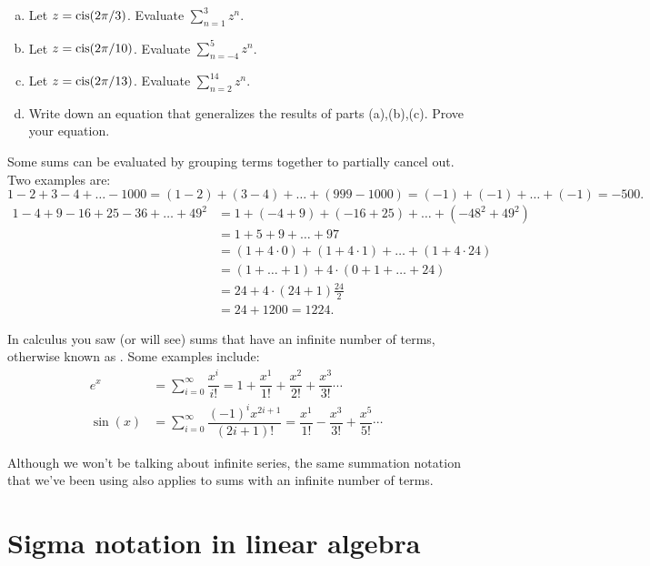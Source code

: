 \begin{exercise}{}
\begin{enumerate}[(a)]
\item
Let $z = \operatorname{cis} (2\pi/3)$.  Evaluate $\sum_{n=1}^3 z^n$.
\item
Let $z = \operatorname{cis} (2\pi/10)$.  Evaluate $\sum_{n=-4}^5 z^n$.
\item
Let $z = \operatorname{cis} (2\pi/13)$.  Evaluate $\sum_{n=2}^{14} z^n$.
\item
Write down an equation that generalizes the results of parts (a),(b),(c).  Prove your equation.  
\end{enumerate}
\end{exercise}


Some sums can be evaluated by grouping terms together to partially cancel out.  Two examples are:
\[
1-2+3-4+\ldots -1000 = (1-2)+(3-4)+\ldots + (999-1000)  = (-1) + (-1) + \ldots + (-1) = -500.
\]
\begin{align*}
1 - 4 + 9 -16 + 25 - 36 + \ldots +49^2 &=  1 + (-4+9) + (-16+25) + \ldots + (-48^2+49^2)\\
& = 1 + 5 + 9 + \ldots + 97\\
& = (1 + 4\cdot 0) + (1 + 4\cdot 1) + \ldots + (1 + 4 \cdot 24) \\
&= (1 + \ldots + 1) + 4\cdot(0 + 1 + \ldots + 24) \\
& = 24 + 4\cdot (24+1)\frac{24}{2}\\
&= 24 + 1200 = 1224.
\end{align*}  

In calculus you saw (or will see) sums that have an infinite number of terms, otherwise known as . Some examples include:
\begin{align*}
e^x &= \sum_{i=0}^{\infty}\dfrac{x^i}{i!} =1+\dfrac{x^1}{1!}+\dfrac{x^2}{2!}+\dfrac{x^3}{3!} \cdots \\
\sin(x) &= \sum_{i=0}^{\infty}\dfrac{(-1)^i x^{2i+1}}{(2i+1)!} = \dfrac{x^1}{1!}-\dfrac{x^3}{3!}+\dfrac{x^5}{5!}\cdots
\end{align*}

Although we won't be talking about infinite series, the same summation notation that we've been using also applies to sums with an infinite number of terms. 

\section{Sigma notation in linear algebra\quad
{}}\label{sec:sigmaLinAlg}

